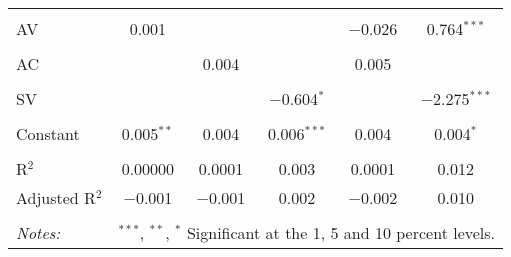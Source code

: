 
\begin{tabular}{@{\extracolsep{5pt}}lccccc} 
\hline \\[-1.8ex] 
 AV & 0.001 &  &  & $-$0.026 & 0.764$^{***}$ \\ 
  & & & & & \\ 
 AC &  & 0.004 &  & 0.005 &  \\ 
  & & & & & \\ 
 SV &  &  & $-$0.604$^{*}$ &  & $-$2.275$^{***}$ \\ 
  & & & & & \\ 
 Constant & 0.005$^{**}$ & 0.004 & 0.006$^{***}$ & 0.004 & 0.004$^{*}$ \\ 
  & & & & & \\ 
R$^{2}$ & 0.00000 & 0.0001 & 0.003 & 0.0001 & 0.012 \\ 
Adjusted R$^{2}$ & $-$0.001 & $-$0.001 & 0.002 & $-$0.002 & 0.010 \\ 
\hline 
\hline \\[-1.8ex] 
\textit{Notes:} & \multicolumn{5}{r}{$^{***}$, $^{**}$, $^{*}$ Significant at the 1, 5 and 10 percent levels.} \\ 
\end{tabular} 
